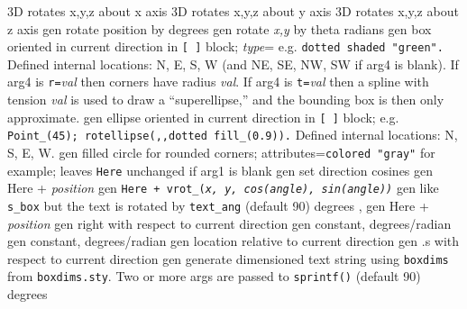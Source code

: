   {3D}
  {rotates x,y,z about x axis}
  {3D}
  {rotates x,y,z about y axis}
  {3D}
  {rotates x,y,z about z axis}
  {gen}
  {rotate position by degrees}
  {gen}
  {rotate {\sl x,y} by theta radians}
  {gen}
  {box oriented in current direction in {\tt [ ]} block;
   {\sl type}= e.g. {\tt dotted shaded "green".}  Defined
   internal locations: N, E, S, W (and NE, SE, NW, SW if arg4 is blank).
   If arg4 is {\tt r=}{\sl val} then corners have radius {\sl val}.
   If arg4 is {\tt t=}{\sl val} then a spline with tension {\sl val}
   is used to draw a ``superellipse,'' and the bounding box is then
   only approximate. }
  {gen}
  {ellipse oriented in current direction in {\tt [ ]} block;
   e.g. {\tt Point\_(45); rotellipse(,{},dotted fill\_(0.9)).} Defined internal
   locations: N, S, E, W.}
  {gen}
  {filled circle for rounded corners; attributes={\tt colored "gray"} 
   for example; leaves {\tt Here} unchanged if arg1 is blank
    }
  {gen}
  {set direction cosines}
  {gen}
  {Here + {\sl position}}
  {gen}
  {\tt Here + vrot\_({\sl x, y, cos(angle), sin(angle))}}
  {gen}
  {like {\tt s\_box} but the text is rotated by {\tt text\_ang}
   (default 90) degrees , }
  {gen}
  {Here + {\sl position}}
  {gen}
  {right with respect to current direction}
  {gen}
  {constant, degrees/radian}
  {gen}
  {constant, degrees/radian}
  {gen}
  {location relative to current direction}
  {gen}
  {.s with respect to current direction}
  {gen}
  {generate dimensioned text string using {\tt{}boxdims} from
    {\tt boxdims.sty}. Two or more args are passed to {\tt sprintf()}
   (default 90) degrees }
